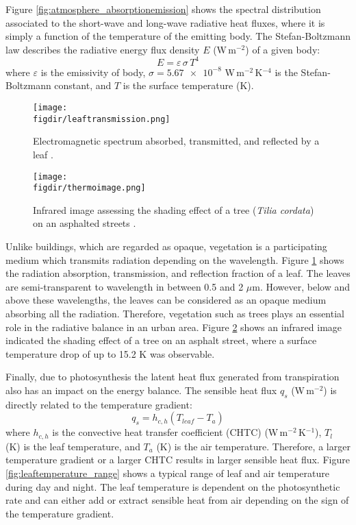 Figure \ref{fig:atmosphere_absorptionemission} shows the spectral distribution associated to the short-wave and long-wave radiative heat fluxes, where it is simply a function of the temperature of the emitting body. The Stefan-Boltzmann law describes the radiative energy flux density $E$  (W\,m$^{-2}$) of a given body:
\begin{equation}
E = \varepsilon\,\sigma\,T^4
\end{equation}  
where $\varepsilon$ is the emissivity of body, $\sigma = \num{5.67e-8}$ W\,m$^{-2}$\,K$^{-4}$ is the Stefan-Boltzmann constant, and $T$ is the surface temperature (K). 

\begin{figure}[p]
	\centering
	\texttt{[image: \\figdir/leaftransmission.png]}
	\caption{Electromagnetic spectrum absorbed, transmitted, and reflected by a leaf \citep{Lambers2008,nobel2009physicochemical}. }
	\label{fig:leaftransmission}
\end{figure}

\begin{figure}[p]
	\centering
	\texttt{[image: \\figdir/thermoimage.png]}
	\caption{Infrared image assessing the shading effect of a tree (\textit{Tilia cordata}) on an asphalted streets \citep{Gillner2015}. }
	\label{fig:thermoimage}
\end{figure}	

Unlike buildings, which are regarded as opaque, vegetation is a participating medium which transmits radiation depending on the wavelength. Figure \ref{fig:leaftransmission} shows the radiation absorption, transmission, and reflection fraction of a leaf. The leaves are semi-transparent to wavelength in between 0.5 and 2 $\mu$m. However, below and above these wavelengths, the leaves can be considered as an opaque medium absorbing all the radiation. Therefore, vegetation such as trees plays an essential role in the radiative balance in an urban area. Figure \ref{fig:thermoimage} shows an infrared image indicated the shading effect of a tree on an asphalt street, where a surface temperature drop of up to 15.2 K was observable.

Finally, due to photosynthesis the latent heat flux generated from transpiration also has an impact on the energy balance. The sensible heat flux $q_s$ (W\,m$^{-2}$) is directly related to the temperature gradient:
\begin{equation}
q_s = h_{c,h} \left(T_{\textit{leaf}} - T_a\right)
\end{equation}
where $h_{c,h}$ is the convective heat transfer coefficient (CHTC) (W\,m$^{-2}$\,K$^{-1}$), $T_l$ (K) is the leaf temperature, and $T_a$ (K) is the air temperature. Therefore, a larger temperature gradient or a larger CHTC results in larger sensible heat flux. Figure \ref{fig:leaftemperature_range} shows a typical range of leaf and air temperature during day and night. The leaf temperature is dependent on the photosynthetic rate and can either add or extract sensible heat from air depending on the sign of the temperature gradient.

